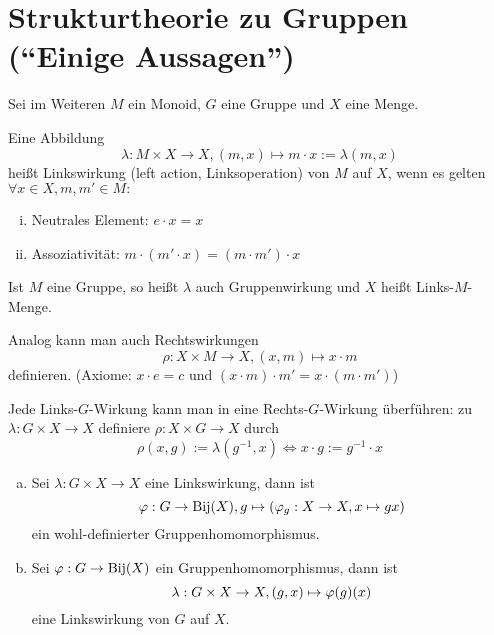 \documentclass[a4paper]{report}
\begin{document}
\section{Strukturtheorie zu Gruppen (``Einige Aussagen'')}
Sei im Weiteren $M$ ein Monoid, $G$ eine Gruppe und $X$ eine Menge.
\begin{defi}
\label{def:Wirkung}
  Eine Abbildung
  $$\lambda : M \times X \to X, (m,x) \mapsto m \cdot x := \lambda(m,x)$$
  heißt Linkswirkung (left action, Linksoperation) von $M$ auf $X$, wenn es gelten $\forall x \in X, m, m' \in M:$
  \begin{enumerate}[(i)]
    \item Neutrales Element: $e\cdot x = x$
    \item Assoziativität: $m\cdot (m'\cdot x) = (m\cdot m') \cdot x$
  \end{enumerate}
\end{defi}
\begin{bez*}
  Ist $M$ eine Gruppe, so heißt $\lambda$ auch Gruppenwirkung und $X$ heißt Links-$M$-Menge.
\end{bez*}
\begin{bem*} Analog kann man auch Rechtswirkungen
  $$\rho : X \times M \to X, (x,m) \mapsto x \cdot m$$
  definieren. (Axiome: $x\cdot e = c$ und $(x\cdot m)\cdot m' = x \cdot (m \cdot m')$)
\end{bem*}
\begin{bem*}[Übung]
  Jede Links-$G$-Wirkung kann man in eine Rechts-$G$-Wirkung überführen:
  zu $\lambda: G \times X \to X$ definiere $\rho : X \times G \to X$ durch
  $$\rho(x,g) := \lambda(g^{-1}, x) \iff x \cdot g := g^{-1} \cdot x$$
\end{bem*}
\begin{prop} \item
\begin{enumerate}[(a)]
  \item Sei $\lambda: G \times X \to X$ eine Linkswirkung, dann ist
        $$\varphi : G \to \operatorname{Bij}(X), g \mapsto (\varphi_{g}: X \to X, x \mapsto gx)$$
        ein wohl-definierter Gruppenhomomorphismus.
  \item Sei $\varphi : G \to \operatorname{Bij}(X)$ ein Gruppenhomomorphismus, dann ist
        $$\lambda: G \times X \to X, (g,x) \mapsto \varphi(g)(x)$$
        eine Linkswirkung von $G$ auf $X$.
\end{enumerate}
\end{prop}
\end{document}

